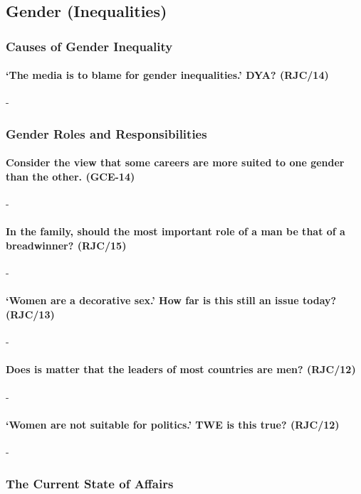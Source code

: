 \documentclass[../../main]{subfiles}
\begin{document}
\subsection{Gender (Inequalities)}

\subsubsection{Causes of Gender Inequality}

\paragraph{`The media is to blame for gender inequalities.' DYA? (RJC/14)}-

\subsubsection{Gender Roles and Responsibilities}

\paragraph{Consider the view that some careers are more suited to one gender than the other. (GCE-14)}-

\paragraph{In the family, should the most important role of a man be that of a breadwinner? (RJC/15)}-

\paragraph{`Women are a decorative sex.' How far is this still an issue today? (RJC/13)}-

\paragraph{Does is matter that the leaders of most countries are men? (RJC/12)}-

\paragraph{`Women are not suitable for politics.' TWE is this true? (RJC/12)}-

\subsubsection{The Current State of Affairs}
\end{document}

